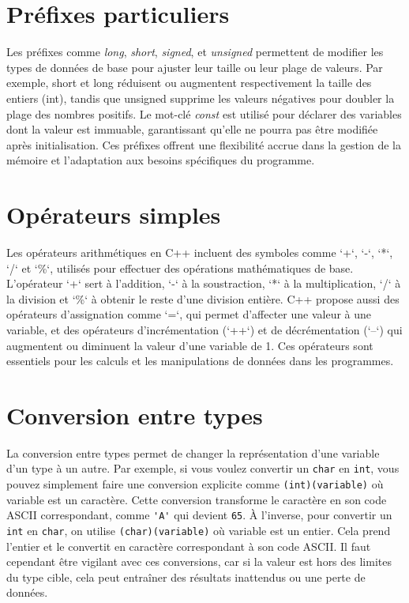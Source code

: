 



\section{Préfixes particuliers}
Les préfixes comme \emph{long}, \emph{short}, \emph{signed}, et \emph{unsigned} permettent de modifier les types de données de base pour ajuster leur taille ou leur plage de valeurs. Par exemple, short et long réduisent ou augmentent respectivement la taille des entiers (int), tandis que unsigned supprime les valeurs négatives pour doubler la plage des nombres positifs. Le mot-clé \emph{const} est utilisé pour déclarer des variables dont la valeur est immuable, garantissant qu’elle ne pourra pas être modifiée après initialisation. Ces préfixes offrent une flexibilité accrue dans la gestion de la mémoire et l’adaptation aux besoins spécifiques du programme.

\section{Opérateurs simples}
Les opérateurs arithmétiques en C++ incluent des symboles comme `+`, `-`, `*`, `/` et `\%`, utilisés pour effectuer des opérations mathématiques de base. L'opérateur `+` sert à l'addition, `-` à la soustraction, `*` à la multiplication, `/` à la division et `\%` à obtenir le reste d'une division entière. C++ propose aussi des opérateurs d'assignation comme `=`, qui permet d'affecter une valeur à une variable, et des opérateurs d'incrémentation (`++`) et de décrémentation (`--`) qui augmentent ou diminuent la valeur d'une variable de 1. Ces opérateurs sont essentiels pour les calculs et les manipulations de données dans les programmes.




\section{Conversion entre types}
La conversion entre types permet de changer la représentation d'une variable d’un type à un autre. Par exemple, si vous voulez convertir un \lstinline|char| en \lstinline|int|, vous pouvez simplement faire une conversion explicite comme \lstinline|(int)(variable)| où variable est un caractère. Cette conversion transforme le caractère en son code ASCII correspondant, comme \lstinline|'A'| qui devient \lstinline|65|. À l'inverse, pour convertir un \lstinline|int| en \lstinline|char|, on utilise \lstinline|(char)(variable)| où variable est un entier. Cela prend l'entier et le convertit en caractère correspondant à son code ASCII. Il faut cependant être vigilant avec ces conversions, car si la valeur est hors des limites du type cible, cela peut entraîner des résultats inattendus ou une perte de données.